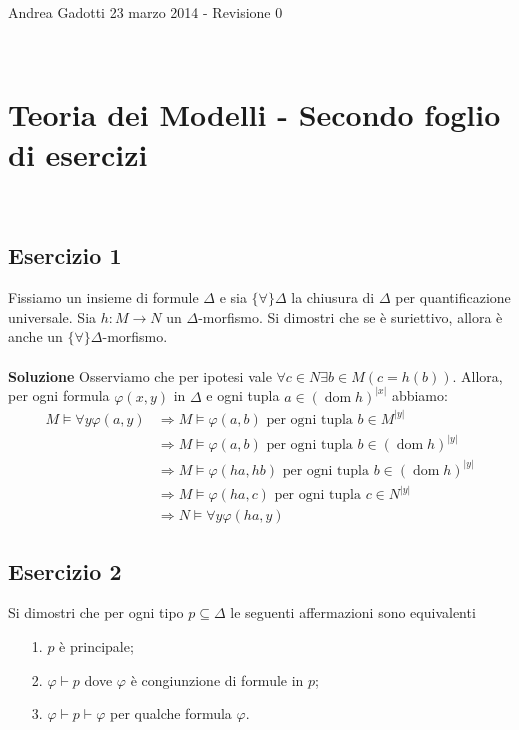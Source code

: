 \documentclass[10pt,a4paper]{article}
\def\phi{\varphi}
\def\A{\forall}
\def\imp{\rightarrow}
\def\models{\vDash}
\def\proves{\vdash}
\DeclareMathOperator{\dom}{dom}
\begin{document}
\noindent Andrea Gadotti \hfill 23 marzo 2014 - Revisione 0 

\

\section*{Teoria dei Modelli - Secondo foglio di esercizi}

\
\subsection*{Esercizio 1}
Fissiamo un insieme di formule $\Delta$ e sia $\{\A\}\Delta$ la chiusura di $\Delta$ per quantificazione universale. Sia $h:M\imp N$ un $\Delta$-morfismo. Si dimostri che se è suriettivo, allora \`e anche un $\{\A\}\Delta$-morfismo.\\
\\
\noindent\textbf{Soluzione}
Osserviamo che per ipotesi vale $\forall c \in N \exists b \in M (c=h(b))$. Allora, per ogni formula $\phi(x,y)$ in $\Delta$ e ogni tupla $a \in (\dom h)^{|x|}$ abbiamo:
\begin{equation*}
\begin{split}
M \models \forall y \phi(a,y) 
& \Rightarrow M \models \phi(a,b) \text{ per ogni tupla } b \in M^{|y|}\\
& \Rightarrow M \models \phi(a,b) \text{ per ogni tupla } b \in (\dom h)^{|y|}\\
& \Rightarrow M \models \phi(ha,hb) \text{ per ogni tupla } b \in (\dom h)^{|y|}\\
& \Rightarrow M \models \phi(ha,c) \text{ per ogni tupla } c \in N^{|y|}\\
& \Rightarrow N \models \forall y \phi(ha,y) 
\end{split}
\end{equation*}




\subsection*{Esercizio 2}
Si dimostri che per ogni tipo $p\subseteq\Delta$ le seguenti affermazioni sono equivalenti
\begin{itemize}
\item[1.] $p$ \`e principale;
\item[2.] $\phi\proves p$ dove $\phi$ \`e congiunzione di formule in $p$;
\item[3.] $\phi\proves p\proves \phi$ per qualche formula $\phi$. 
\end{itemize}
\end{document}
